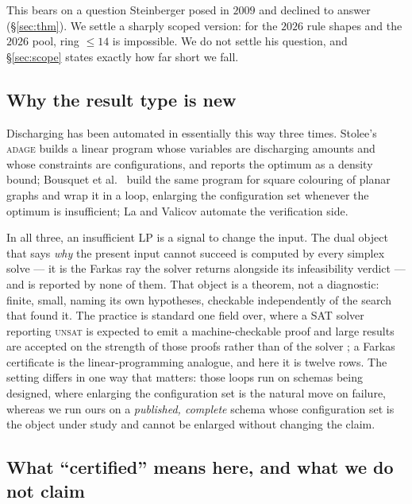 \documentclass[11pt]{article}
\theoremstyle{definition}
\begin{document}
This bears on a question Steinberger \cite{steinberger2010} posed in $2009$ and
declined to answer (\S\ref{sec:thm}). We settle a sharply scoped version: for the
$2026$ rule shapes and the $2026$ pool, ring $\le 14$ is impossible. We do not
settle his question, and \S\ref{sec:scope} states exactly how far short we fall.

\subsection{Why the result type is new}
\label{sec:novelty}

Discharging has been automated in essentially this way three times. Stolee's
\textsc{adage} \cite{stolee2014} builds a linear program whose variables are
discharging amounts and whose constraints are configurations, and reports the
optimum as a density bound; Bousquet et al.\ \cite{bousquet2024square} build the
same program for square colouring of planar graphs and wrap it in a loop,
enlarging the configuration set whenever the optimum is insufficient; La and
Valicov \cite{lavalicov2022} automate the verification side.

In all three, an insufficient LP is a signal to change the input. The dual object
that says \emph{why} the present input cannot succeed is computed by every
simplex solve --- it is the Farkas ray the solver returns alongside its
infeasibility verdict --- and is reported by none of them. That object is a
theorem, not a diagnostic: finite, small, naming its own hypotheses, checkable
independently of the search that found it. The practice is standard one field
over, where a SAT solver reporting \textsc{unsat} is expected to emit a
machine-checkable proof and large results are accepted on the strength of those
proofs rather than of the solver \cite{subercaseaux2023packing}; a Farkas
certificate is the linear-programming analogue, and here it is twelve rows. The
setting differs in
one way that matters: those loops run on schemas being designed, where enlarging
the configuration set is the natural move on failure, whereas we run ours on a
\emph{published, complete} schema whose configuration set is the object under
study and cannot be enlarged without changing the claim.

\subsection{What ``certified'' means here, and what we do not claim}
\label{sec:notclaim}
\end{document}
